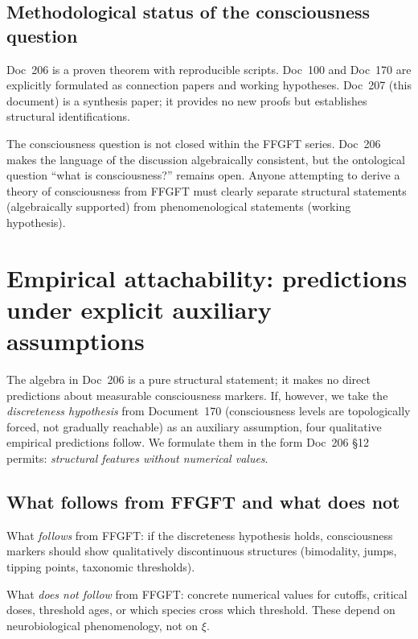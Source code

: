 \subsection{Methodological status of the consciousness question}

Doc~206 is a proven theorem with reproducible scripts. Doc~100 and Doc~170 are explicitly formulated as connection papers and working hypotheses. Doc~207 (this document) is a synthesis paper; it provides no new proofs but establishes structural identifications.

\begin{interpretation}
The consciousness question is not closed within the FFGFT series. Doc~206 makes the language of the discussion algebraically consistent, but the ontological question ``what is consciousness?'' remains open. Anyone attempting to derive a theory of consciousness from FFGFT must clearly separate structural statements (algebraically supported) from phenomenological statements (working hypothesis).
\end{interpretation}

\section{Empirical attachability: predictions under explicit auxiliary assumptions}\label{sec:predictions}

The algebra in Doc~206 is a pure structural statement; it makes no direct predictions about measurable consciousness markers. If, however, we take the \emph{discreteness hypothesis} from Document~170 (consciousness levels are topologically forced, not gradually reachable) as an auxiliary assumption, four qualitative empirical predictions follow. We formulate them in the form Doc~206 \S12 permits: \emph{structural features without numerical values}.

\subsection{What follows from FFGFT and what does not}\label{sec:predictions_follows}

\begin{important}
What \emph{follows} from FFGFT: if the discreteness hypothesis holds, consciousness markers should show qualitatively discontinuous structures (bimodality, jumps, tipping points, taxonomic thresholds).

What \emph{does not follow} from FFGFT: concrete numerical values for cutoffs, critical doses, threshold ages, or which species cross which threshold. These depend on neurobiological phenomenology, not on $\xi$.
\end{important}

